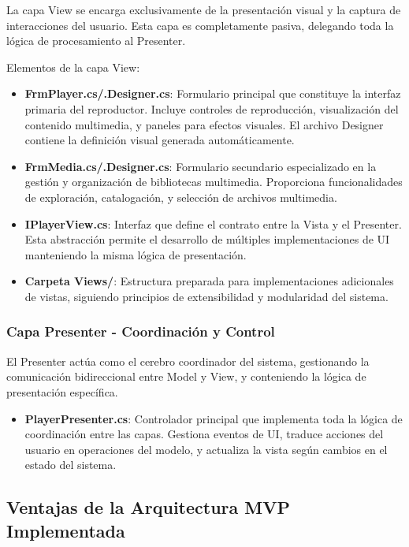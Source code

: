 \documentclass[a4paper]{article}
\begin{document}
La capa View se encarga exclusivamente de la presentación visual y la captura de interacciones del usuario. Esta capa es completamente pasiva, delegando toda la lógica de procesamiento al Presenter.

Elementos de la capa View:

\begin{itemize}
\item \textbf{FrmPlayer.cs/.Designer.cs}: Formulario principal que constituye la interfaz primaria del reproductor. Incluye controles de reproducción, visualización del contenido multimedia, y paneles para efectos visuales. El archivo Designer contiene la definición visual generada automáticamente.

\item \textbf{FrmMedia.cs/.Designer.cs}: Formulario secundario especializado en la gestión y organización de bibliotecas multimedia. Proporciona funcionalidades de exploración, catalogación, y selección de archivos multimedia.

\item \textbf{IPlayerView.cs}: Interfaz que define el contrato entre la Vista y el Presenter. Esta abstracción permite el desarrollo de múltiples implementaciones de UI manteniendo la misma lógica de presentación.

\item \textbf{Carpeta Views/}: Estructura preparada para implementaciones adicionales de vistas, siguiendo principios de extensibilidad y modularidad del sistema.
\end{itemize}

\subsubsection{Capa Presenter - Coordinación y Control}

El Presenter actúa como el cerebro coordinador del sistema, gestionando la comunicación bidireccional entre Model y View, y conteniendo la lógica de presentación específica.

\begin{itemize}
\item \textbf{PlayerPresenter.cs}: Controlador principal que implementa toda la lógica de coordinación entre las capas. Gestiona eventos de UI, traduce acciones del usuario en operaciones del modelo, y actualiza la vista según cambios en el estado del sistema.
\end{itemize}

\subsection{Ventajas de la Arquitectura MVP Implementada}
\end{document}
